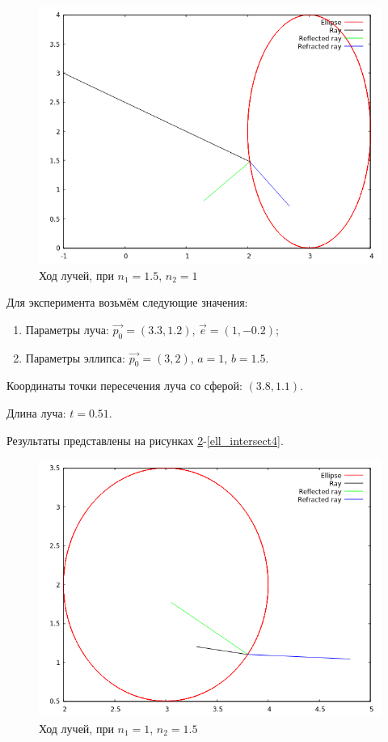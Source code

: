{	\begin{figure}[H]
		\includegraphics[width=0.7\pagewidth]{ell_intersect2}
		\caption{Ход лучей, при $n_1 = 1.5$, $n_2 = 1$}
		\label{ell_intersect2}
	\end{figure}
	
	Для эксперимента возьмём следующие значения:
	\begin{enumerate}
	\item Параметры луча: $\vec{p_0} = (3.3, 1.2)$, $\vec{e} = (1, -0.2)$;
	\item Параметры эллипса: $\vec{p_0} = (3, 2)$, $a = 1$, $b = 1.5$.
	\end{enumerate}
	
	Координаты точки пересечения луча со сферой: $(3.8, 1.1)$.
	
	Длина луча: $t = 0.51$.
	
	Результаты представлены на рисунках \ref{ell_intersect3}-\ref{ell_intersect4}.
	
	\begin{figure}[H]
		\includegraphics[width=0.7\pagewidth]{ell_intersect3}
		\caption{Ход лучей, при $n_1 = 1$, $n_2 = 1.5$}
		\label{ell_intersect3}
	\end{figure}
	
}

